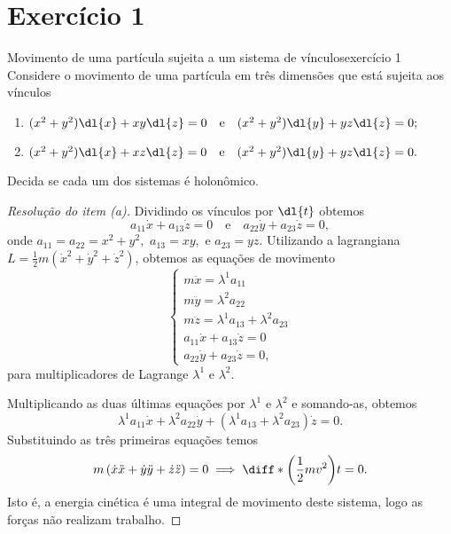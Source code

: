 \section*{Exercício 1}
\begin{exercício}{Movimento de uma partícula sujeita a um sistema de vínculos}{exercício 1}
    Considere o movimento de uma partícula em três dimensões que está sujeita aos vínculos
    \begin{enumerate}[label=(\alph*)]
        \item \((x^2 + y^2)\dl{x} + xy\dl{z} = 0\quad\text{e}\quad(x^2+y^2)\dl{y} + yz\dl{z} = 0;\)
        \item \((x^2 + y^2)\dl{x} + xz\dl{z} = 0\quad\text{e}\quad(x^2+y^2)\dl{y} + yz\dl{z} = 0.\)
    \end{enumerate}
    Decida se cada um dos sistemas é holonômico.
\end{exercício}
\begin{proof}[Resolução do item (a)]
    Dividindo os vínculos por \(\dl{t}\) obtemos
    \begin{equation*}
        a_{11}\dot{x} + a_{13} \dot{z} = 0\quad\text{e}\quad a_{22}\dot{y} + a_{23}\dot{z} = 0,
    \end{equation*}
    onde \(a_{11} = a_{22} = x^2+y^2,\) \(a_{13} = xy,\) e \(a_{23} = yz\). Utilizando a lagrangiana \(L = \frac12 m \left(\dot{x}^2 + \dot{y}^2 + \dot{z}^2\right)\), obtemos as equações de movimento
    \begin{equation*}
        \begin{cases}
            m\ddot{x} = \lambda^1a_{11}\\
            m\ddot{y} = \lambda^2a_{22}\\
            m\ddot{z} = \lambda^1a_{13} + \lambda^2a_{23}\\
            a_{11}\dot{x} + a_{13} \dot{z} = 0\\
            a_{22}\dot{y} + a_{23}\dot{z} = 0,
        \end{cases}
    \end{equation*}
    para multiplicadores de Lagrange \(\lambda^1\) e \(\lambda^2\).

    Multiplicando as duas últimas equações por \(\lambda^1\) e \(\lambda^2\) e somando-as, obtemos
    \begin{equation*}
        \lambda^1 a_{11} \dot{x} + \lambda^2 a_{22} \dot{y} + \left(\lambda^1 a_{13} + \lambda^2 a_{23}\right)\dot{z} = 0.
    \end{equation*}
    Substituindo as três primeiras equações temos
    \begin{equation*}
        m\left(\dot{x}\ddot{x} + \dot{y}\ddot{y} + \dot{z}\ddot{z}\right) = 0 \implies \diff*{\left(\frac12mv^2\right)}{t} = 0.
    \end{equation*}
    Isto é, a energia cinética é uma integral de movimento deste sistema, logo as forças não realizam trabalho. 
\end{proof}
